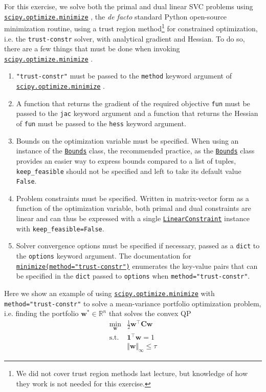 \documentclass{article}
\numberwithin{equation}{section}
\newcommand{\minimize}{%
    \href{%
        https://docs.scipy.org/doc/scipy/reference/generated/%
        scipy.optimize.minimize.html%
    }{\texttt{scipy.optimize.minimize}}%
}
\newcommand{\minimizetrustconstr}{%
    \href{%
        https://docs.scipy.org/doc/scipy/reference/optimize.%
        minimize-trustconstr.html%
    }{\texttt{minimize(method="trust-constr")}}%
}
\newcommand{\Bounds}{%
    \href{%
        https://docs.scipy.org/doc/scipy/reference/generated/%
        scipy.optimize.Bounds.html%
    }{\texttt{Bounds}}%
}
\newcommand{\LinearConstraint}{%
    \href{%
        https://docs.scipy.org/doc/scipy/reference/generated/%
        scipy.optimize.LinearConstraint.html%
    }{\texttt{LinearConstraint}}%
}
\begin{document}
For this exercise, we solve both the primal and dual linear SVC problems
using \minimize{}, the \textit{de facto} standard Python open-source
minimization routine, using a trust region method\footnote{
    We did not cover trust region methods last lecture, but knowledge of how
    they work is not needed for this exercise.
} for constrained optimization, i.e. the \texttt{trust-constr} solver, with
analytical gradient and Hessian. To do so, there are a few things that must
be done when invoking \minimize.

\begin{enumerate}
    \item
    \texttt{"trust-constr"} must be passed to the \texttt{method} keyword
    argument of \minimize.

    \item
    A function that returns the gradient of the required objective
    \texttt{fun} must be passed to the \texttt{jac} keyword argument and a
    function that returns the Hessian of \texttt{fun} must be passed to the
    \texttt{hess} keyword argument.

    \item
    Bounds on the optimization variable must be specified. When using an
    instance of the \Bounds{} class, the recommended practice, as the
    \Bounds{} class provides an easier way to express bounds compared to a
    list of tuples, \texttt{keep\_feasible} should not be specified and left
    to take its default value \texttt{False}.

    \item
    Problem constraints must be specified. Written in matrix-vector form as
    a function of the optimization variable, both primal and dual constraints
    are linear and can thus be expressed with a single \LinearConstraint{}
    instance with \texttt{keep\_feasible=False}.

    \item
    Solver convergence options must be specified if necessary, passed as a
    \texttt{dict} to the \texttt{options} keyword argument. The documentation
    for \minimizetrustconstr{} enumerates the key-value pairs that can be
    specified in the \texttt{dict} passed to \texttt{options} when
    \texttt{method="trust-constr"}.
\end{enumerate}

Here we show an example of using \minimize{} with
\texttt{method="trust-constr"} to solve a mean-variance portfolio
optimization problem, i.e. finding the portfolio
$ \mathbf{w}^* \in \mathbb{R}^n $ that solves the convex QP
\begin{equation} \label{eq:max_norm_port_opt}
    \begin{array}{ll}
        \displaystyle\min_{\mathbf{w}} &
            \frac{1}{2}\mathbf{w}^\top\mathbf{Cw} \\
        \text{s.t.} & \mathbf{1}^\top\mathbf{w} = 1 \\
            & \Vert\mathbf{w}\Vert_\infty \le \tau
    \end{array}
\end{equation}
\end{document}
